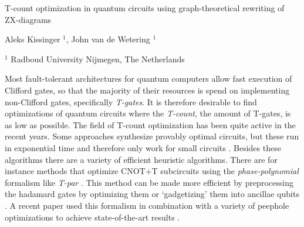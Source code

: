 \documentclass[a4paper,11pt]{article}
\begin{document}

\Large
 \begin{center}
T-count optimization in quantum circuits using graph-theoretical rewriting of ZX-diagrams\\ 

\hspace{10pt}

\normalsize
Aleks Kissinger $^1$, John van de Wetering $^1$ \\

\hspace{10pt}

\small  
$^1$ Radboud University Nijmegen, The Netherlands


\end{center}

\hspace{10pt}

\normalsize

\noindent

Most fault-tolerant architectures for quantum computers allow fast execution of Clifford gates, so that the majority of their resources is spend on implementing non-Clifford gates, specifically \emph{T-gates}. It is therefore desirable to find optimizations of quantum circuits where the \emph{T-count}, the amount of T-gates, is as low as possible. The field of T-count optimization has been quite active in the recent years. Some approaches synthesize provably optimal circuits, but these run in exponential time and therefore only work for small circuits \cite{di2016parallelizing}. Besides these algorithms there are a variety of efficient heuristic algorithms. There are for instance methods that optimize CNOT+T subcircuits using the \emph{phase-polynomial} formalism like \emph{T-par} \cite{amy2014polynomial}. This method can be made more efficient by preprocessing the hadamard gates by optimizing them \cite{abdessaied2014quantum} or `gadgetizing' them into ancillae qubits \cite{heyfron2018efficient}. A recent paper used this formalism in combination with a variety of peephole optimizations to achieve state-of-the-art results \cite{nam2018automated}.
\end{document}
